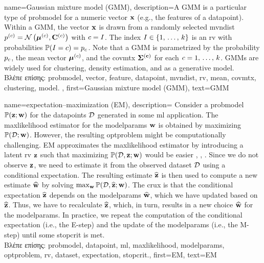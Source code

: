 {name={Gaussian mixture model (GMM)}, 
	description={A GMM 
		is a particular type of \gls{probmodel} for a numeric \gls{vector} ${\bf x}$ (e.g., 
		the \gls{feature}s of a \gls{datapoint}). Within a GMM, the \gls{vector} ${\bf x}$ is drawn from a randomly 
		selected \gls{mvndist} $p^{(c)} = \mathcal{N}\left({\bm \mu}^{(c)},\mathbf{C}^{(c)}\right)$ with 
		$c = I$. The index $I \in \{1, \,\ldots, \,k\}$ is an \gls{rv} with probabilities $\mathbb{P}({I=c}) = p_{c}$.
	     	Note that a GMM is parametrized by the \gls{probability} $p_{c}$, the 
		\gls{mean} \gls{vector} ${\bm \mu}^{(c)}$, and the \gls{covmtx} $\bf\Sigma^{(c)}$ for each $c=1, \,\ldots, \,k$. 
		GMMs are widely used for \gls{clustering}, density estimation, and as a generative \gls{model}.\\
		\foreignlanguage{greek}{Βλέπε επίσης:} \gls{probmodel}, \gls{vector}, \gls{feature}, \gls{datapoint}, \gls{mvndist}, \gls{rv}, 
		\gls{mean}, \gls{covmtx}, \gls{clustering}, \gls{model}. },
	first={Gaussian mixture model (GMM)},
	text={GMM} 
}
	 
{name={expectation–maximization (EM)}, 
	description={ 
		Consider a \gls{probmodel} $\mathbb{P}({{\bf z}; {\bf w}})$ for the \gls{datapoint}s $\mathcal{D}$ generated in some 
		\gls{ml} application. The \gls{maxlikelihood} estimator for the \gls{modelparams} ${\bf w}$ is obtained by maximizing 
		$\mathbb{P}({\mathcal{D}; {\bf w}})$. However, the resulting \gls{optproblem} might be computationally 
		challenging. EM approximates the \gls{maxlikelihood} estimator by introducing a latent 
		\gls{rv} ${\bf z}$ such that maximizing $\mathbb{P}({\mathcal{D},{\bf z}; {\bf w}})$ would be 
		easier \cite{hastie01statisticallearning}, \cite{BishopBook}, \cite{GraphModExpFamVarInfWainJor}. Since we 
		do not observe ${\bf z}$, we need to estimate it from the observed \gls{dataset} $\mathcal{D}$ 
		using a conditional \gls{expectation}. The resulting estimate $\widehat{{\bf z}}$ is then used to 
		compute a new estimate $\widehat{{\bf w}}$ by solving $\max_{{\bf w}} \mathbb{P}({\mathcal{D}, \widehat{{\bf z}}; {\bf w}})$. 
		The crux is that the conditional \gls{expectation} $\widehat{{\bf z}}$ depends on the \gls{modelparams} $\widehat{{\bf w}}$, 
		which we have updated based on $\widehat{{\bf z}}$. Thus, we have to recalculate $\widehat{{\bf z}}$, 
		which, in turn, results in a new choice $\widehat{{\bf w}}$ for the \gls{modelparams}. In practice, 
		we repeat the computation of the conditional \gls{expectation} (i.e., the E-step) and the update 
		of the \gls{modelparams} (i.e., the M-step) until some \gls{stopcrit} is met.\\
		\foreignlanguage{greek}{Βλέπε επίσης:} \gls{probmodel}, \gls{datapoint}, \gls{ml}, \gls{maxlikelihood}, \gls{modelparams}, 
		\gls{optproblem}, \gls{rv}, \gls{dataset}, \gls{expectation}, \gls{stopcrit}.},
	first={EM},
  	text={EM}
}

